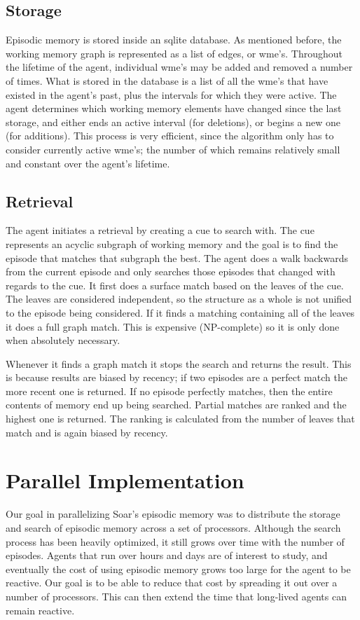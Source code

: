 \documentclass[11pt]{article} %
\begin{document}
\subsection{Storage}
Episodic memory is stored inside an sqlite database. As mentioned before, the
working memory graph is represented as a list of edges, or wme’s. Throughout the
lifetime of the agent, individual wme’s may be added and removed a number of
times. What is stored in the database is a list of all the wme’s that have
existed in the agent’s past, plus the intervals for which they were active. The
agent determines which working memory elements have changed since the last
storage, and either ends an active interval (for deletions), or begins a new one
(for additions). This process is very efficient, since the algorithm only has to
consider currently active wme’s; the number of which remains relatively small
and constant over the agent’s lifetime.

\subsection {Retrieval}
The agent initiates a retrieval by creating a cue to search with. The cue
represents an acyclic subgraph of working memory and the goal is to find the
episode that matches that subgraph the best. The agent does a walk backwards
from the current episode and only searches those episodes that changed with
regards to the cue. It first does a surface match based on the leaves of the
cue. The leaves are considered independent, so the structure as a whole is not
unified to the episode being considered. If it finds a matching containing all
of the leaves it does a full graph match. This is expensive (NP-complete) so it
is only done when absolutely necessary.

Whenever it finds a graph match it stops the search and returns the result. This
is because results are biased by recency; if two episodes are a perfect match
the more recent one is returned. If no episode perfectly matches, then the
entire contents of memory end up being searched. Partial matches are ranked and
the highest one is returned. The ranking is calculated from the number of leaves
that match and is again biased by recency.

\section{Parallel Implementation}
Our goal in parallelizing Soar’s episodic memory was to distribute the storage
and search of episodic memory across a set of processors. Although the search
process has been heavily optimized, it still grows over time with the number of
episodes. Agents that run over hours and days are of interest to study, and
eventually the cost of using episodic memory grows too large for the agent to be
reactive. Our goal is to be able to reduce that cost by spreading it out over a
number of processors. This can then extend the time that long-lived agents can
remain reactive.
\end{document}
